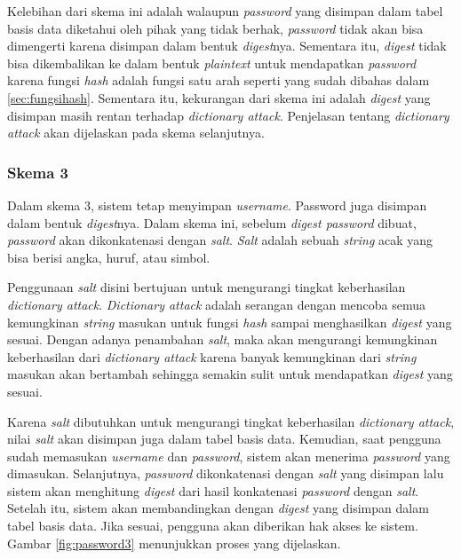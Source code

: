 Kelebihan dari skema ini adalah walaupun \textit{password} yang disimpan dalam tabel basis data diketahui oleh pihak yang tidak berhak, \textit{password} tidak akan bisa dimengerti karena disimpan dalam bentuk \textit{digest}nya. Sementara itu, \textit{digest} tidak bisa dikembalikan ke dalam bentuk \textit{plaintext} untuk mendapatkan \textit{password} karena fungsi \textit{hash} adalah fungsi satu arah seperti yang sudah dibahas dalam \ref{sec:fungsihash}. Sementara itu, kekurangan dari skema ini adalah \textit{digest} yang disimpan masih rentan terhadap \textit{dictionary attack}. Penjelasan tentang \textit{dictionary attack} akan dijelaskan pada skema selanjutnya.

\subsubsection{Skema 3}

Dalam skema 3, sistem tetap menyimpan \textit{username}. Password juga disimpan dalam bentuk \textit{digest}nya. Dalam skema ini, sebelum \textit{digest password} dibuat, \textit{password} akan dikonkatenasi dengan \textit{salt}. \textit{Salt} adalah sebuah \textit{string} acak yang bisa berisi angka, huruf, atau simbol.

Penggunaan \textit{salt} disini bertujuan untuk mengurangi tingkat keberhasilan \textit{dictionary attack}. \textit{Dictionary attack} adalah serangan dengan mencoba semua kemungkinan \textit{string} masukan untuk fungsi \textit{hash} sampai menghasilkan \textit{digest} yang sesuai. Dengan adanya penambahan \textit{salt}, maka akan mengurangi kemungkinan keberhasilan dari \textit{dictionary attack} karena banyak kemungkinan dari \textit{string} masukan akan bertambah sehingga semakin sulit untuk mendapatkan \textit{digest} yang sesuai.

Karena \textit{salt} dibutuhkan untuk mengurangi tingkat keberhasilan \textit{dictionary attack}, nilai \textit{salt} akan disimpan juga dalam tabel basis data. Kemudian, saat pengguna sudah memasukan \textit{username} dan \textit{password}, sistem akan menerima \textit{password} yang dimasukan. Selanjutnya, \textit{password} dikonkatenasi dengan \textit{salt} yang disimpan lalu sistem akan menghitung \textit{digest} dari hasil konkatenasi \textit{password} dengan \textit{salt}. Setelah itu, sistem akan membandingkan dengan \textit{digest} yang disimpan dalam tabel basis data. Jika sesuai, pengguna akan diberikan hak akses ke sistem. Gambar \ref{fig:password3} menunjukkan proses yang dijelaskan.

